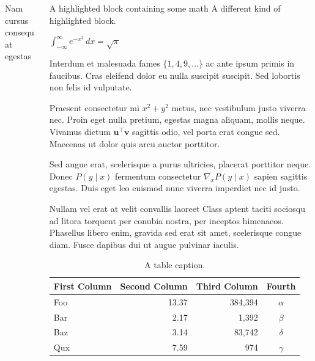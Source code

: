 \documentclass[final]{beamer}
\newlength{\sepwidth}
\newcommand{\separatorcolumn}{\begin{column}{\sepwidth}\end{column}}
\begin{document}
\begin{frame}[label={sec:orgd60d47b}]{}
\begin{columns}
\begin{column}{0.3\columnwidth}
\begin{block}{Nam cursus consequat egestas}
\end{block}
\end{column}

\begin{column}{0.3\columnwidth}
\begin{exampleblock}{A highlighted block containing some math}
A different kind of highlighted block.

\(\int_{-\infty}^{\infty} e^{-x^2}\,dx = \sqrt{\pi}\)

Interdum et malesuada fames \(\{1, 4, 9, \ldots\}\) ac ante ipsum primis in
faucibus. Cras eleifend dolor eu nulla suscipit suscipit. Sed lobortis non felis
id vulputate.

{}

Praesent consectetur mi \(x^2 + y^2\) metus, nec vestibulum justo viverra
nec. Proin eget nulla pretium, egestas magna aliquam, mollis neque. Vivamus
dictum \(\mathbf{u}^\intercal\mathbf{v}\) sagittis odio, vel porta erat congue
sed. Maecenas ut dolor quis arcu auctor porttitor.


Sed augue erat, scelerisque a purus ultricies, placerat porttitor neque.
Donec \(P(y \mid x)\) fermentum consectetur \(\nabla_x P(y \mid x)\) sapien
sagittis egestas. Duis eget leo euismod nunc viverra imperdiet nec id
justo.
\end{exampleblock}

\begin{block}{Nullam vel erat at velit convallis laoreet}
Class aptent taciti sociosqu ad litora torquent per conubia nostra, per
inceptos himenaeos. Phasellus libero enim, gravida sed erat sit amet,
scelerisque congue diam. Fusce dapibus dui ut augue pulvinar iaculis.

\begin{table}[htbp]
\caption{A table caption.}
\centering
\footnotesize
\begin{tabular}{lrrc}
First Column & Second Column & Third Column & Fourth\\[0pt]
\hline
Foo & 13.37 & 384,394 & \(\alpha\)\\[0pt]
Bar & 2.17 & 1,392 & \(\beta\)\\[0pt]
Baz & 3.14 & 83,742 & \(\delta\)\\[0pt]
Qux & 7.59 & 974 & \(\gamma\)\\[0pt]
\end{tabular}
\end{table}


\end{block}
\end{column}
\end{columns}
\end{frame}
\end{document}
